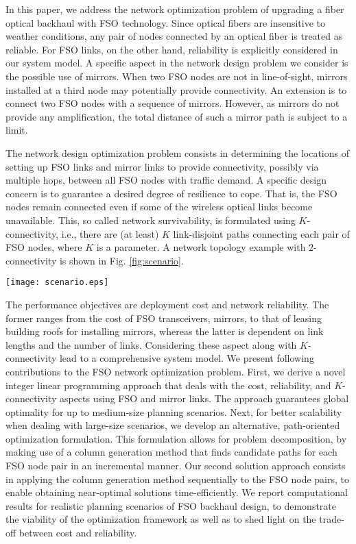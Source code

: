 \documentclass[onecolumn,11pt,draftclsnofoot]{IEEEtran}
\begin{document}
In this paper, we address the network optimization problem of upgrading a fiber optical backhaul with FSO technology. Since optical fibers are insensitive to weather conditions, any pair of nodes connected by an optical fiber is treated as reliable. For FSO links, on the other hand, reliability is explicitly considered in our system model. A specific aspect in the network design problem we consider is the possible use of mirrors. When two FSO nodes are not in line-of-sight, mirrors installed at a third node may potentially provide connectivity. An extension is to connect two FSO nodes with a sequence of mirrors. However, as mirrors do not provide any amplification, the total distance of such a mirror path is subject to a limit.

The network design optimization problem consists in determining the locations of setting up FSO links and mirror links to provide connectivity, possibly via multiple hops, between all FSO nodes with traffic demand. A specific design concern is to guarantee a desired degree of resilience to cope. That is, the FSO nodes remain connected even if some of the wireless optical links become unavailable. This, so called network survivability, is formulated using $K$-connectivity, i.e., there are (at least) $K$ link-disjoint paths connecting each pair of FSO nodes, where $K$ is a parameter. A network topology example with $2$-connectivity is shown in Fig. \ref{fig:scenario}.

\begin{figure*}
\centering
\texttt{[image: scenario.eps]}
\caption{A backhaul network deployment scenario with FSO transceivers, mirrors and fibers}\label{fig:scenario}
\end{figure*}

The performance objectives are deployment cost and network reliability. The former ranges from the cost of FSO transceivers, mirrors, to that of leasing building roofs for installing mirrors, whereas the latter is dependent on link lengths and the number of links. Considering these aspect along with $K$-connectivity lead to a comprehensive system model. We present following contributions to the FSO network optimization problem. First, we derive a novel integer linear programming approach that deals with the cost, reliability, and $K$-connectivity aspects using FSO and mirror links. The approach guarantees global optimality for up to medium-size planning scenarios. Next, for better scalability when dealing with large-size scenarios, we develop an alternative, path-oriented optimization formulation. This formulation allows for problem decomposition, by making use of a column generation method that finds candidate paths for each FSO node pair in an incremental manner. Our second solution approach consists in applying the column generation method sequentially to the FSO node pairs, to enable obtaining near-optimal solutions time-efficiently. We report computational results for realistic planning scenarios of FSO backhaul design, to demonstrate the viability of the optimization framework as well as to shed light on the trade-off between cost and reliability.
\end{document}
